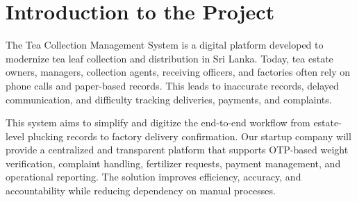 \section{Introduction to the Project}
\label{sec:introduction}

The Tea Collection Management System is a digital platform developed to modernize tea leaf collection and distribution in Sri Lanka. Today, tea estate owners, managers, collection agents, receiving officers, and factories often rely on phone calls and paper-based records. This leads to inaccurate records, delayed communication, and difficulty tracking deliveries, payments, and complaints.

This system aims to simplify and digitize the end-to-end workflow from estate-level plucking records to factory delivery confirmation. Our startup company will provide a centralized and transparent platform that supports OTP-based weight verification, complaint handling, fertilizer requests, payment management, and operational reporting. The solution improves efficiency, accuracy, and accountability while reducing dependency on manual processes.

